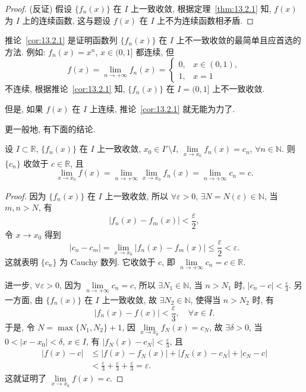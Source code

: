 \begin{proof}
(反证) 假设 $\{f_{n}(x)\}$ 在 $I$ 上一致收敛, 根据定理~\ref{thm:13.2.1} 知, $f(x)$ 为 $I$ 上的连续函数, 这与题设 $f(x)$ 在 $I$ 上不为连续函数相矛盾.
\end{proof}

推论~\ref{cor:13.2.1} 是证明函数列 $\{f_{n}(x)\}$ 在 $I$ 上不一致收敛的最简单且应首选的方法. 例如: $f_{n}(x)=x^{n}$, $x\in(0,1]$ 都连续, 但
\[
  f(x)=\lim_{n\to+\infty}f_{n}(x)=\begin{cases}
    0, & x\in(0,1),\\
    1, & x=1
\end{cases}
\]
不连续, 根据推论~\ref{cor:13.2.1} 知, $\{f_{n}(x)\}$ 在 $I=(0,1]$ 上不一致收敛.

但是, 如果 $f(x)$ 在 $I$ 上连续, 推论~\ref{cor:13.2.1} 就无能为力了.

更一般地, 有下面的结论.

\begin{theorem}\label{thm:13.2.2}
设 $I\subset\mathbb{R}$, $\{f_{n}(x)\}$ 在 $I$ 上一致收敛, $x_{0}\in I'\setminus I$, $\lim\limits_{x\to x_{0}}f_{n}(x)=c_{n}$, $\forall n\in\mathbb{N}$. 则 $\{c_{n}\}$ 收敛于 $c\in\mathbb{R}$, 且
\[
  \lim_{x\to x_{0}}f(x)=\lim_{n\to+\infty}\lim_{x\to x_{0}}f_{n}(x)=\lim_{n\to+\infty}c_{n}=c.
\]
\end{theorem}

\begin{proof}
因为 $\{f_{n}(x)\}$ 在 $I$ 上一致收敛, 所以 $\forall\varepsilon>0$, $\exists N=N(\varepsilon)\in\mathbb{N}$, 当 $m,n>N$, 有
\[
  |f_{n}(x)-f_{m}(x)|<\frac{\varepsilon}{2},
\]
令 $x\to x_{0}$ 得到
\[
  |c_{n}-c_{m}|=\lim_{x\to x_{0}}|f_{n}(x)-f_{m}(x)|\leqslant\frac{\varepsilon}{2}<\varepsilon.
\]
这就表明 $\{c_{n}\}$ 为 Cauchy 数列. 它收敛于 $c$, 即 $\lim\limits_{n\to+\infty}c_{n}=c\in\mathbb{R}$.

进一步, $\forall\varepsilon>0$, 因为 $\lim\limits_{n\to+\infty}c_{n}=c$, 所以 $\exists N_{1}\in\mathbb{N}$, 当 $n>N_{1}$ 时, $|c_{n}-c|<\frac{\varepsilon}{3}$. 另一方面, 由 $\{f_{n}(x)\}$ 在 $I$ 上一致收敛, 故 $\exists N_{2}\in\mathbb{N}$, 使得当 $n>N_{2}$ 时, 有
\[
  |f_{n}(x)-f(x)|<\frac{\varepsilon}{3},\quad\forall x\in I.
\]
于是, 令 $N=\max\{N_{1},N_{2}\}+1$, 因 $\lim\limits_{x\to x_{0}}f_{N}(x)=c_{N}$, 故 $\exists\delta>0$, 当 $0<|x-x_{0}|<\delta$, $x\in I$, 有 $|f_{N}(x)-c_{N}|<\frac{\varepsilon}{3}$, 且
\[
  \begin{aligned}
    |f(x)-c|&\leqslant|f(x)-f_{N}(x)|+|f_{N}(x)-c_{N}|+|c_{N}-c|\\
    &<\frac{\varepsilon}{3}+\frac{\varepsilon}{3}+\frac{\varepsilon}{3}=\varepsilon.
  \end{aligned}
\]
这就证明了 $\lim\limits_{x\to x_{0}}f(x)=c$.
\end{proof}

